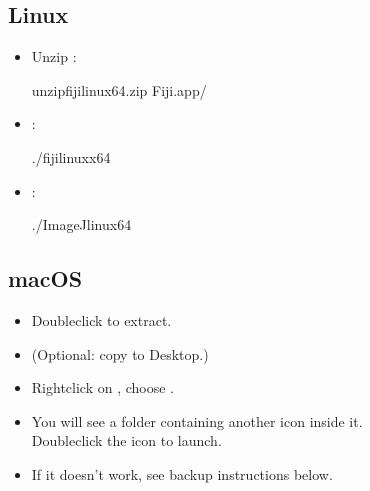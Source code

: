 \documentclass[letterpaper,10pt,english]{jupyterBook}
\begin{document}
\subsection{Linux}
\label{\detokenize{installation:linux}}\begin{itemize}
\item {} 
\sphinxAtStartPar
Unzip :

\begin{sphinxVerbatim}[commandchars=\\\{\}]
unzipfiji\PYGZhy{}linux64.zip
Fiji.app/
\end{sphinxVerbatim}

\item {} 
\sphinxAtStartPar
{}:

\begin{sphinxVerbatim}[commandchars=\\\{\}]
./fiji\PYGZhy{}linux\PYGZhy{}x64
\end{sphinxVerbatim}

\item {} 
\sphinxAtStartPar
{}:

\begin{sphinxVerbatim}[commandchars=\\\{\}]
./ImageJ\PYGZhy{}linux64
\end{sphinxVerbatim}

\end{itemize}


\subsection{macOS}
\label{\detokenize{installation:macos}}\begin{itemize}
\item {} 
\sphinxAtStartPar
Double\sphinxhyphen{}click  to extract.

\item {} 
\sphinxAtStartPar
(Optional: copy  to Desktop.)

\item {} 
\sphinxAtStartPar
Right\sphinxhyphen{}click on  , choose .

\item {} 
\sphinxAtStartPar
You will see a folder containing another   icon inside it.\\
Double\sphinxhyphen{}click the   icon to launch.

\item {} 
\sphinxAtStartPar
If it doesn’t work, see backup instructions below.

\end{itemize}
\end{document}
